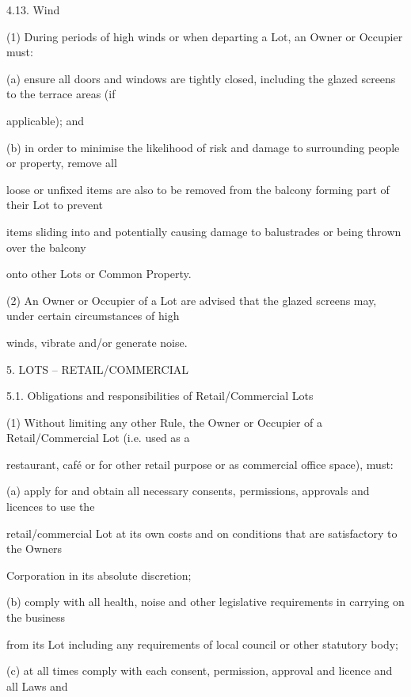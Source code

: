 \documentclass{article}
\begin{document}
{\fontsize{9.99}{1}4.13. Wind }

{\fontsize{9.962}{1}(1) During periods of high winds or when departing a Lot, an Owner or Occupier must: }

{\fontsize{9.962}{1}(a) ensure all doors and windows are tightly closed, including the glazed screens to the terrace areas (if }

{\fontsize{10.02}{1}applicable); and }

{\fontsize{9.962}{1}(b) in order to minimise the likelihood of risk and damage to surrounding people or property, remove all }

{\fontsize{10.02}{1}loose or unfixed items are also to be removed from the balcony forming part of their Lot to prevent }

{\fontsize{10.02}{1}items sliding into and potentially causing damage to balustrades or being thrown over the balcony }

{\fontsize{10.02}{1}onto other Lots or Common Property. }

{\fontsize{9.962}{1}(2) An Owner or Occupier of a Lot are advised that the glazed screens may, under certain circumstances of high }

{\fontsize{10.02}{1}winds, vibrate and/or generate noise. }

{\fontsize{9.99}{1}5. LOTS – RETAIL/COMMERCIAL }

{\fontsize{9.99}{1}5.1. Obligations and responsibilities of Retail/Commercial Lots }

{\fontsize{9.962}{1}(1) Without limiting any other Rule, the Owner or Occupier of a Retail/Commercial Lot (i.e. used as a }

{\fontsize{10.02}{1}restaurant, café or for other retail purpose or as commercial office space), must: }

{\fontsize{9.962}{1}(a) apply for and obtain all necessary consents, permissions, approvals and licences to use the }

{\fontsize{10.02}{1}retail/commercial Lot at its own costs and on conditions that are satisfactory to the Owners }

{\fontsize{10.02}{1}Corporation in its absolute discretion; }

{\fontsize{9.962}{1}(b) comply with all health, noise and other legislative requirements in carrying on the business }

{\fontsize{10.02}{1}from its Lot including any requirements of local council or other statutory body; }

{\fontsize{9.962}{1}(c) at all times comply with each consent, permission, approval and licence and all Laws and }
\end{document}
